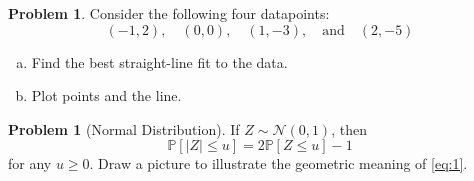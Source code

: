 \documentclass[10pt]{article}
\theoremstyle{definition}
\newtheorem{problem}[theorem]{Problem}
\newcommand{\1}[1]{\textbf{1}_{\left[#1\right]}} %
\def\P{\mathbb{P}} %
\begin{document}
\newpage

\begin{problem}%
  Consider the following four datapoints:
  \begin{equation*}
    (-1,2), \quad (0,0), \quad (1,-3), \quad\text{and} \quad (2,-5)
  \end{equation*}
  \begin{enumerate}[(a)]
    \item Find the best straight-line fit to the data. 
    \item Plot points and the line.
  \end{enumerate}
\end{problem}


\begin{problem}[Normal Distribution]
  If $Z\sim \mathcal{N}(0,1)$, then
  \begin{equation}\label{eq:1}
    \P\left[|Z| \leq u \right] = 2 \P\left[Z \leq u\right]-1
  \end{equation}
  for any $u \geq 0$. Draw a picture to illustrate the geometric meaning of \cref{eq:1}.
\end{problem}
\end{document}
